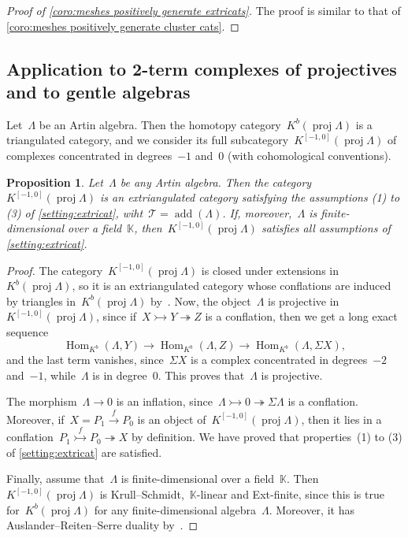 \documentclass{amsart}
\newtheorem{proposition}[theorem]{Proposition}
\theoremstyle{definition}
\newcommand{\field}{\mathbb{K}}
\newcommand{\Hom}[1]{\operatorname{Hom}_{#1}}
\newcommand{\susp}{\Sigma}
\newcommand{\add}{\operatorname{add}}
\newcommand{\proj}{\operatorname{proj}}
\newcommand{\tc}{\mathcal{T}}
\newcommand{\infl}{\rightarrowtail}
\newcommand{\defl}{\twoheadrightarrow}
\begin{document}
\begin{proof}[Proof of \cref{coro:meshes positively generate extricats}]
The proof is similar to that of \cref{coro:meshes positively generate cluster cats}.
\end{proof}


\subsection{Application to 2-term complexes of projectives and to gentle algebras}
\label{sec:Kbproj}

Let~$\Lambda$ be an Artin algebra.
Then the homotopy category~$K^b(\proj \Lambda)$ is a triangulated category, and we consider its full subcategory~$K^{[-1,0]}(\proj \Lambda)$ of complexes concentrated in degrees~$-1$ and~$0$ (with cohomological conventions).

\begin{proposition}
\label{prop:2kbproj-is-extriangulated}
Let~$\Lambda$ be any Artin algebra. Then the category~$K^{[-1,0]}(\proj \Lambda)$ is an extriangulated category satisfying the assumptions (1) to (3) of \cref{setting:extricat}, wiht~$\tc = \add(\Lambda)$. If, moreover,~$\Lambda$ is finite-dimensional over a field~$\field$, then~$K^{[-1,0]}(\proj \Lambda)$ satisfies all assumptions of \cref{setting:extricat}. 
\end{proposition}

\begin{proof}
The category~$K^{[-1,0]}(\proj \Lambda)$ is closed under extensions in~$K^b(\proj \Lambda)$, so it is an extriangulated category whose conflations are induced by triangles in~$K^b(\proj\Lambda)$ by~\cite[Rem.~2.18]{NakaokaPalu}. Now, the object~$\Lambda$ is projective in~$K^{[-1,0]}(\proj \Lambda)$, since if~$X\infl Y\defl Z$ is a conflation, then we get a long exact sequence
\[
\Hom{K^b}(\Lambda,Y)\to \Hom{K^b}(\Lambda,Z) \to  \Hom{K^b}(\Lambda, \susp X),
\]
and the last term vanishes, since~$\susp X$ is a complex concentrated in degrees~$-2$ and~$-1$, while~$\Lambda$ is in degree~$0$. This proves that~$\Lambda$ is projective.
 
The morphism~$\Lambda \to 0$ is an inflation, since~$\Lambda\infl 0 \defl \susp \Lambda$ is a conflation. Moreover, if~$X= P_1\xrightarrow{f}P_0$ is an object of~$K^{[-1,0]}(\proj\Lambda)$, then it lies in a conflation~$P_1\stackrel{f}{\infl} P_0 \defl X$ by definition. We have proved that properties~(1) to (3) of \cref{setting:extricat} are satisfied.
 
Finally, assume that~$\Lambda$ is finite-dimensional over a field~$\field$. Then~$K^{[-1,0]}(\proj\Lambda)$ is Krull--Schmidt,~$\field$-linear and Ext-finite, since this is true for~$K^b(\proj\Lambda)$ for any finite-dimensional algebra~$\Lambda$. Moreover, it has Auslander--Reiten--Serre duality by~\cite[Prop.~6.1]{IyamaNakaokaPalu}.
\end{proof}
\end{document}
